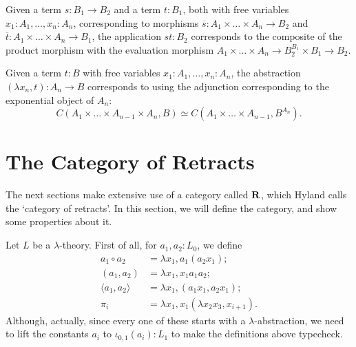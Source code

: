 Given a term $ s: B_1 \to B_2 $ and a term $ t: B_1 $, both with free variables $ x_1: A_1, \dots, x_n: A_n $, corresponding to morphisms $ \overline s: A_1 \times \dots \times A_n \to B_2 $ and $ \overline t: A_1 \times \dots \times A_n \to B_1 $, the application $ st: B_2 $ corresponds to the composite of the product morphism with the evaluation morphism $ A_1 \times \dots \times A_n \to B_2^{B_1} \times B_1 \to B_2 $.
\begin{center}
\end{center}

Given a term $ t: B $ with free variables $ x_1: A_1, \dots, x_n: A_n $, the abstraction $ (\lambda x_n, t): A_n \to B $ corresponds to using the adjunction corresponding to the exponential object of $ A_n $:
\[ C(A_1 \times \dots \times A_{n-1} \times A_n, B) \simeq C(A_1 \times \dots \times A_{n-1}, B^{A_n}). \]

\section{The Category of Retracts}\label{sec:retracts-category}

The next sections make extensive use of a category called $ \mathbf{R} $, which Hyland calls the `category of retracts'. In this section, we will define the category, and show some properties about it.

Let $ L $ be a $ \lambda $-theory. First of all, for $ a_1, a_2: L_0 $, we define
\begin{align*}
  a_1 \circ a_2 &= \lambda x_1, a_1 (a_2 x_1);\\
  (a_1, a_2) &= \lambda x_1, x_1 a_1 a_2;\\
  \langle a_1, a_2 \rangle &= \lambda x_1, (a_1 x_1, a_2 x_1);\\
  \pi_i &= \lambda x_1, x_1 (\lambda x_2 x_3, x_{i + 1}).
\end{align*}
Although, actually, since every one of these starts with a $ \lambda $-abstraction, we need to lift the constants $ a_i $ to $ \iota_{0, 1}(a_i): L_1 $ to make the definitions above typecheck.

